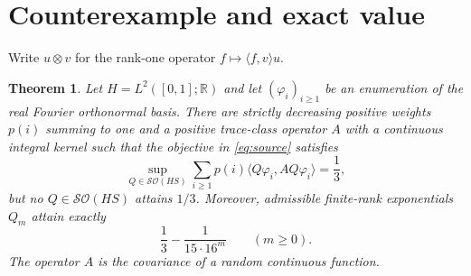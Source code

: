 \documentclass[11pt]{article}
\newtheorem{theorem}{Theorem}
\newcommand{\R}{\mathbb R}
\begin{document}
\section{Counterexample and exact value}

Write $u\otimes v$ for the rank-one operator
$f\mapsto\langle f,v\rangle u$.

\begin{theorem}\label{thm:main}
Let $H=L^2([0,1];\R)$ and let $(\varphi_i)_{i\geq1}$ be an enumeration of
the real Fourier orthonormal basis.  There are strictly decreasing positive
weights $p(i)$ summing to one and a positive trace-class operator $A$ with a
continuous integral kernel such that the objective in \eqref{eq:source}
satisfies
\[
 \sup_{Q\in\mathcal{SO}(HS)}
 \sum_{i\geq1}p(i)\langle Q\varphi_i,AQ\varphi_i\rangle
 =\frac13,
\]
but no $Q\in\mathcal{SO}(HS)$ attains $1/3$.
Moreover, admissible finite-rank exponentials $Q_m$ attain exactly
\[
 \frac13-\frac{1}{15\cdot16^m}\qquad(m\geq0).
\]
The operator $A$ is the covariance of a random continuous function.
\end{theorem}
\end{document}
